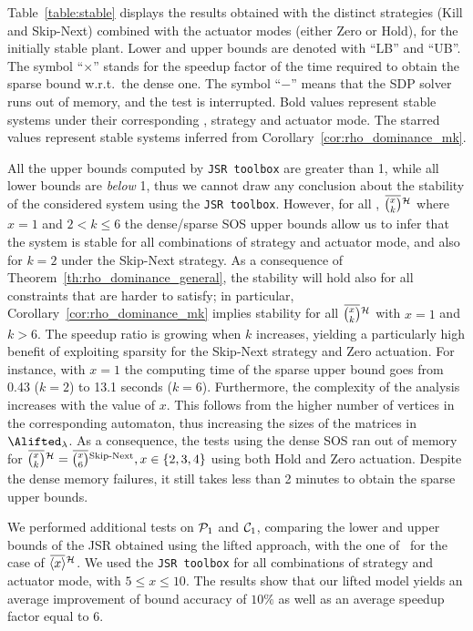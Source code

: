 Table~\ref{table:stable} displays the results obtained with the distinct strategies (Kill and Skip-Next) combined with the actuator modes (either Zero or Hold), for the initially stable plant.
Lower and upper bounds are denoted with ``LB'' and ``UB''.
The symbol ``$\times$'' stands for the speedup factor of the time required to obtain the sparse bound w.r.t.~the dense one.
The symbol ``$-$'' means that the SDP solver runs out of memory, and the test is interrupted.
Bold values represent stable systems under their corresponding \ewhc{}, strategy and actuator mode.
The starred values represent stable systems inferred from Corollary~\ref{cor:rho_dominance_mk}.

All the upper bounds computed by \texttt{JSR toolbox} are greater than 1, while all lower bounds are \emph{below} 1, thus we cannot draw any conclusion about the stability of the considered system using the \texttt{JSR toolbox}.
However, for all \ewhc{}, $\eanymiss{}{\strat}$ where $x=1$ and $2<k\leq 6$ the dense/sparse SOS upper bounds allow us to infer that the system is stable for all combinations of strategy and actuator mode, and also for $k=2$ under the Skip-Next strategy.
As a consequence of Theorem~\ref{th:rho_dominance_general}, the stability will hold also for all constraints that are harder to satisfy; in particular, Corollary~\ref{cor:rho_dominance_mk} implies stability for all $\eanymiss{}{\strat}$ with $x=1$ and $k>6$.
The speedup ratio is growing when $k$ increases, yielding a particularly high benefit of exploiting sparsity for the Skip-Next strategy and Zero actuation.
For instance, with $x=1$ the computing time of the sparse upper bound goes from 0.43 ($k=2$) to 13.1 seconds ($k=6$).
%
Furthermore, the complexity of the analysis increases with the value of $x$.
This follows from the higher number of vertices in the corresponding automaton, thus increasing the sizes of the matrices in $\Alifted_{\lambda}$. 
%
As a consequence, the tests using the dense SOS ran out of memory for $\eanymiss{}{\strat} = \overbar{\binom{x}{6}}^{\text{Skip-Next}}, x \in \left\{ 2, 3, 4 \right\}$ using both Hold and Zero actuation.
Despite the dense memory failures, it still takes less than 2 minutes to obtain the sparse upper bounds.

We performed additional tests on $\mathcal{P}_1$ and $\mathcal{C}_1$, comparing the lower and upper bounds of the JSR obtained using the lifted approach, with the one of~\cite{Maggio:2020} for the case of $\overbar{\left<x\right>}^{\strat}$.
We used the \texttt{JSR toolbox} for all combinations of strategy and actuator mode, with $5 \leq x \leq 10$.
The results show that our lifted model yields an average improvement of bound accuracy of $10 \%$ as well as an average speedup factor equal to $6$.

